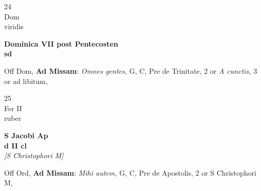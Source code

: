 \documentclass[10pt, openany]{book}
\begin{document}
        \begin{center}
            \begin{minipage}{3.5in}
                \vspace{2em}
                \begin{minipage}{0.5in}
                    {\Huge 24} \\
                    {\normalsize Dom} \\
                    {\normalsize viridis}
                \end{minipage}
                \begin{minipage}{3.0in}
                    \textbf{ \large Dominica VII post Pentecosten \\
                    \textnormal{\normalsize sd}} \\ 
                \end{minipage}
                \begin{justify}Off Dom, \textbf{Ad Missam}: \textit{Omnes gentes,} G, C, Pre de Trinitate, 2 or \textit{A cunctis,} 3 or ad libitum,  
                \end{justify}
            \end{minipage}
        \end{center}
    
        \begin{center}
            \begin{minipage}{3.5in}
                \vspace{2em}
                \begin{minipage}{0.5in}
                    {\Huge 25} \\
                    {\normalsize Fer II} \\
                    {\normalsize ruber}
                \end{minipage}
                \begin{minipage}{3.0in}
                    \textbf{ \large S Jacobi Ap \\
                    \textnormal{\normalsize d II cl}} \\ \textit{[S Christophori M]} \\ 
                \end{minipage}
                \begin{justify}Off Ord, \textbf{Ad Missam}: \textit{Mihi autem,} G, C, Pre de Apostolis, 2 or S Christophori M,  
                \end{justify}
            \end{minipage}
        \end{center}
    
\end{document}
